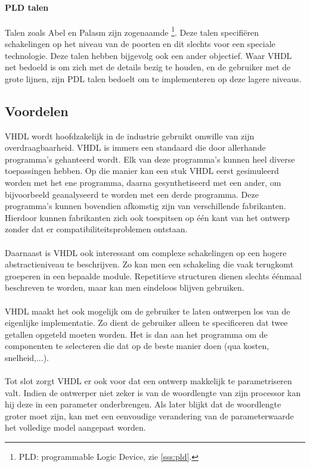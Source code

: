 \paragraph{PLD talen}
Talen zoals Abel en Palasm zijn zogenaamde \footnote{PLD: programmable Logic Device, zie \ref{sss:pld}.}. Deze talen specifi\"eren schakelingen op het niveau van de poorten en dit slechts voor een speciale technologie. Deze talen hebben bijgevolg ook een ander objectief. Waar VHDL net bedoeld is om zich met de details bezig te houden, en de gebruiker met de grote lijnen, zijn PDL talen bedoelt om te implementeren op deze lagere niveaus.
\subsection{Voordelen}
VHDL wordt hoofdzakelijk in de industrie gebruikt omwille van zijn overdraagbaarheid. VHDL is immers een standaard die door allerhande programma's gehanteerd wordt. Elk van deze programma's kunnen heel diverse toepassingen hebben. Op die manier kan een stuk VHDL eerst gesimuleerd worden met het ene programma, daarna gesynthetiseerd met een ander, om bijvoorbeeld geanalyseerd te worden met een derde programma. Deze programma's kunnen bovendien afkomstig zijn van verschillende fabrikanten. Hierdoor kunnen fabrikanten zich ook toespitsen op \'e\'en kant van het ontwerp zonder dat er compatibiliteitsproblemen ontstaan.
\paragraph{}
Daarnaast is VHDL ook interessant om complexe schakelingen op een hogere abstractieniveau te beschrijven. Zo kan men een schakeling die vaak terugkomt groeperen in een bepaalde module. Repetitieve structuren dienen slechts \'e\'enmaal beschreven te worden, maar kan men eindeloos blijven gebruiken.
\paragraph{}
VHDL maakt het ook mogelijk om de gebruiker te laten ontwerpen los van de eigenlijke implementatie. Zo dient de gebruiker alleen te specificeren dat twee getallen opgeteld moeten worden. Het is dan aan het programma om de componenten te selecteren die dat op de beste manier doen (qua kosten, snelheid,...).
\paragraph{}
Tot slot zorgt VHDL er ook voor dat een ontwerp makkelijk te parametriseren valt. Indien de ontwerper niet zeker is van de woordlengte van zijn processor kan hij deze in een parameter onderbrengen. Als later blijkt dat de woordlengte groter moet zijn, kan met een eenvoudige verandering van de parameterwaarde het volledige model aangepast worden.
